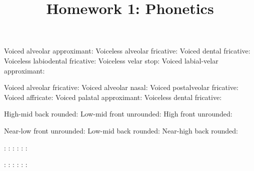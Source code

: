 \documentclass[addpoints]{exam}
\title{Homework 1: Phonetics}
\date{}
\begin{document}
  \maketitle

  


  \begin{questions}

      \parbox[t]{0.45\linewidth}{
        \question[1] Voiced alveolar approximant: \hrulefill
        \question[1] Voiceless alveolar fricative: \hrulefill
        \question[1] Voiced dental fricative: \hrulefill
        \question[1] Voiceless labiodental fricative: \hrulefill
        \question[1] Voiceless velar stop: \hrulefill
        \question[1] Voiced labial-velar approximant: \hrulefill
      }
      \hspace{0.1\linewidth}
      \parbox[t]{0.45\linewidth}{
        \question[1] Voiced alveolar fricative: \hrulefill
        \question[1] Voiced alveolar nasal: \hrulefill
        \question[1] Voiced postalveolar fricative: \hrulefill
        \question[1] Voiced affricate: \hrulefill
        \question[1] Voiced palatal approximant: \hrulefill
        \question[1] Voiceless dental fricative: \hrulefill
      }


      \parbox[t]{0.45\linewidth}{
        \question[1] High-mid back rounded: \hrulefill
        \question[1] Low-mid front unrounded: \hrulefill
        \question[1] High front unrounded: \hrulefill
      }
      \hspace{0.1\linewidth}
      \parbox[t]{0.45\linewidth}{
        \question[1] Near-low front unrounded: \hrulefill
        \question[1] Low-mid back rounded: \hrulefill
        \question[1] Near-high back rounded: \hrulefill
      }


      \parbox[t]{0.45\linewidth}{
        \question[1] [d]: \hrulefill
        \question[1] [l]: \hrulefill
        \question[1] [h]: \hrulefill
        \question[1] [m]: \hrulefill
        \question[1] [ʃ]: \hrulefill
        \question[1] [t]: \hrulefill
      }
      \hspace{0.1\linewidth}
      \parbox[t]{0.45\linewidth}{
        \question[1] [g]: \hrulefill
        \question[1] [ʔ]: \hrulefill
        \question[1] [p]: \hrulefill
        \question[1] [tʃ]: \hrulefill
        \question[1] [ɾ]: \hrulefill
        \question[1] [b]: \hrulefill
      }


\end{questions}
\end{document}
